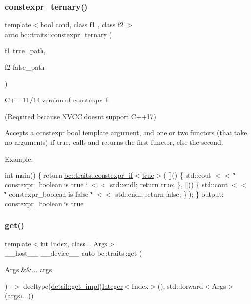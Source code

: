 \mbox{\label{namespacebc_1_1traits_aa4c93747b314d63ac574b3fa27e34eef}} 
\subsubsection{\texorpdfstring{constexpr\+\_\+ternary()}{constexpr\_ternary()}}
{\footnotesize\ttfamily template$<$bool cond, class f1 , class f2 $>$ \\
auto bc\+::traits\+::constexpr\+\_\+ternary (\begin{DoxyParamCaption}\item[{f1}]{true\+\_\+path,  }\item[{f2}]{false\+\_\+path }\end{DoxyParamCaption})}



C++ 11/14 version of constexpr if. 

(Required because N\+V\+CC doesn\textquotesingle{}t support C++17)

Accepts a constexpr bool template argument, and one or two functors (that take no arguments) if true, calls and returns the first functor, else the second.

Example\+:

int main() \{ return \hyperlink{namespacebc_1_1traits_ab6293ec3371433ca2f273e02f72aa70e}{bc\+::traits\+::constexpr\+\_\+if$<$true$>$}( \mbox{[}\mbox{]}() \{ std\+::cout $<$$<$ \char`\"{} constexpr\+\_\+boolean is true  \char`\"{} $<$$<$ std\+::endl; return true; \}, \mbox{[}\mbox{]}() \{ std\+::cout $<$$<$ \char`\"{} constexpr\+\_\+boolean is false \char`\"{} $<$$<$ std\+::endl; return false; \} ); \} output\+: constexpr\+\_\+boolean is true \mbox{\label{namespacebc_1_1traits_a4de446de235c05a01f9143b54df5a136}} 
\subsubsection{\texorpdfstring{get()}{get()}}
{\footnotesize\ttfamily template$<$int Index, class... Args$>$ \\
\+\_\+\+\_\+host\+\_\+\+\_\+ \+\_\+\+\_\+device\+\_\+\+\_\+ auto bc\+::traits\+::get (\begin{DoxyParamCaption}\item[{Args \&\&...}]{args }\end{DoxyParamCaption}) -\/$>$ decltype(\hyperlink{namespacebc_1_1traits_1_1detail_a7f1703c90df0f8695969542729765428}{detail\+::get\+\_\+impl}(\hyperlink{structbc_1_1traits_1_1Integer}{Integer}$<$Index$>$(), std\+::forward$<$Args$>$(args)...))
\hspace{0.3cm}{\ttfamily [inline]}}

